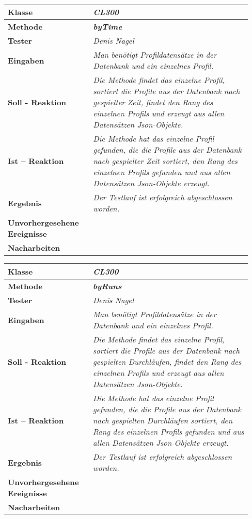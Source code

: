 \begin{longtable}{|p{4cm}|p{11cm}|}
\hline
\textbf{Klasse} & \textit{\textbf{CL300}} \\
\hline
\textbf{Methode} & \textit{\textbf{byTime}} \\
\hline
\textbf{Tester} & \textit{Denis Nagel} \\
\hline
\textbf{Eingaben} & \textit{Man benötigt Profildatensätze in der Datenbank und ein einzelnes Profil.} \\
\hline
\textbf{Soll - Reaktion} & \textit{Die Methode findet das einzelne Profil, sortiert die Profile aus der Datenbank nach gespielter Zeit, findet den Rang des einzelnen Profils und erzeugt aus allen Datensätzen Json-Objekte.} \\
\hline
\textbf{Ist -- Reaktion} & \textit{Die Methode hat das einzelne Profil gefunden, die die Profile aus der Datenbank nach gespielter Zeit sortiert, den Rang des einzelnen Profils gefunden und aus allen Datensätzen Json-Objekte erzeugt.} \\
\hline
\textbf{Ergebnis} & \textit{Der Testlauf ist erfolgreich abgeschlossen worden.} \\
\hline
\textbf{Unvorhergesehene Ereignisse} &
\textit{} \\
\hline
\textbf{Nacharbeiten } & \textit{} \\
\hline
\end{longtable}

\begin{longtable}{|p{4cm}|p{11cm}|}
\hline
\textbf{Klasse} & \textit{\textbf{CL300}} \\
\hline
\textbf{Methode} & \textit{\textbf{byRuns}} \\
\hline
\textbf{Tester} & \textit{Denis Nagel} \\
\hline
\textbf{Eingaben} & \textit{Man benötigt Profildatensätze in der Datenbank und ein einzelnes Profil.} \\
\hline
\textbf{Soll - Reaktion} & \textit{Die Methode findet das einzelne Profil, sortiert die Profile aus der Datenbank nach gespielten Durchläufen, findet den Rang des einzelnen Profils und erzeugt aus allen Datensätzen Json-Objekte.} \\
\hline
\textbf{Ist -- Reaktion} & \textit{Die Methode hat das einzelne Profil gefunden, die die Profile aus der Datenbank nach gespielten Durchläufen sortiert, den Rang des einzelnen Profils gefunden und aus allen Datensätzen Json-Objekte erzeugt.} \\
\hline
\textbf{Ergebnis} & \textit{Der Testlauf ist erfolgreich abgeschlossen worden.} \\
\hline
\textbf{Unvorhergesehene Ereignisse} &
\textit{} \\
\hline
\textbf{Nacharbeiten } & \textit{} \\
\hline
\end{longtable}

